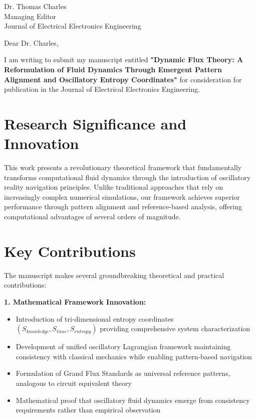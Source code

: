 \documentclass[12pt,a4paper]{letter}
\begin{document}
\begin{letter}{Dr. Thomas Charles\\
Managing Editor\\
Journal of Electrical Electronics Engineering}

\opening{Dear Dr. Charles,}

I am writing to submit my manuscript entitled \textbf{"Dynamic Flux Theory: A Reformulation of Fluid Dynamics Through Emergent Pattern Alignment and Oscillatory Entropy Coordinates"} for consideration for publication in the Journal of Electrical Electronics Engineering.

\section*{Research Significance and Innovation}

This work presents a revolutionary theoretical framework that fundamentally transforms computational fluid dynamics through the introduction of oscillatory reality navigation principles. Unlike traditional approaches that rely on increasingly complex numerical simulations, our framework achieves superior performance through pattern alignment and reference-based analysis, offering computational advantages of several orders of magnitude.

\section*{Key Contributions}

The manuscript makes several groundbreaking theoretical and practical contributions:

\textbf{1. Mathematical Framework Innovation:}
\begin{itemize}
\item Introduction of tri-dimensional entropy coordinates $(S_{knowledge}, S_{time}, S_{entropy})$ providing comprehensive system characterization
\item Development of unified oscillatory Lagrangian framework maintaining consistency with classical mechanics while enabling pattern-based navigation
\item Formulation of Grand Flux Standards as universal reference patterns, analogous to circuit equivalent theory
\item Mathematical proof that oscillatory fluid dynamics emerge from consistency requirements rather than empirical observation
\end{itemize}


\end{letter}
\end{document}
